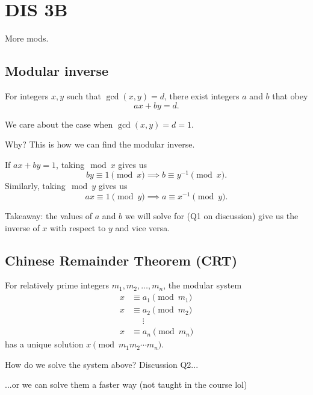 \section{DIS 3B}

More mods. 

\subsection{Modular inverse}
\begin{lemma}[Bézout]
    For integers $x,y$ such that $\gcd(x,y) = d$, there exist integers $a$ and $b$ that obey \[ ax + by = d. \]
\end{lemma}

We care about the case when $\gcd(x,y) = d = 1$. 

Why? This is how we can find the modular inverse. 

\vspace{3mm}

If $ax + by = 1$, taking$\mod x$ gives us \[ by \equiv 1 \pmod{x} \implies b \equiv y^{-1} \pmod{x}. \] Similarly, taking$\mod y$ gives us \[ ax \equiv 1 \pmod{y} \implies a \equiv x^{-1} \pmod{y}. \]

Takeaway: the values of $a$ and $b$ we will solve for (Q1 on discussion) give us the inverse of $x$ with respect to $y$ and vice versa. 

\subsection{Chinese Remainder Theorem (CRT)}

\begin{theorem}[CRT]
    For relatively prime integers $m_1, m_2, \ldots, m_n$, the modular system \begin{align*}
        x &\equiv a_1 \pmod{m_1} \\
        x &\equiv a_2 \pmod{m_2} \\
        &\phantom{=}\vdots \\
        x &\equiv a_n \pmod{m_n} 
    \end{align*} has a unique solution $x \pmod{m_1m_2\cdots m_n}$. 
\end{theorem}

How do we solve the system above? Discussion Q2...

...or we can solve them a faster way (not taught in the course lol)

